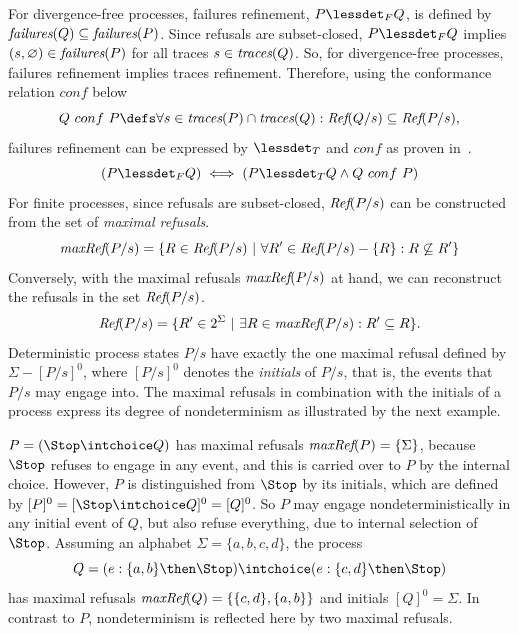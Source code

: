 For divergence-free processes, failures refinement, $P \lessdet_F Q$, is
defined by $\text{\it failures}(Q)\subseteq\text{\it failures}(P)$. Since refusals are subset-closed,
$P \lessdet_F Q$ implies $(s,\varnothing)\in\text{\it failures}(P)$ for all traces
$s\in\text{\it traces}(Q)$. So, for divergence-free processes, failures refinement implies
traces refinement. Therefore, using the conformance relation $conf$ below
%
\begin{equation}\label{eq:conf}
  Q\ conf\ P \defs \forall s\in \trc(P) \cap \trc(Q): \refs(Q/s)
  \subseteq \refs(P/s),
\end{equation}
%
failures refinement can be expressed by $\lessdet_T$ and $conf$ as proven
in~\cite{DBLP:conf/icfem/CavalcantiG07}.
%
\begin{equation}%
\label{eq:failconf}
(P \lessdet_F Q) \iff (P \lessdet_T Q \land Q\ conf\ P)
\end{equation}
%
For finite processes, since refusals are subset-closed, $\text{\it Ref}(P/s)$ can be
constructed from the set of \emph{maximal refusals}.
%
\begin{equation}
\text{\it maxRef}(P/s) = \{ R \in\text{\it Ref}(P/s)~|~\forall R'\in \text{\it Ref}(P/s) - \{ R\}: R \not\subseteq R'\}
\end{equation}
%
Conversely, with the maximal refusals $\text{\it maxRef}(P/s)$ at hand, we can
reconstruct the refusals in the set $\text{\it Ref}(P/s)$. %
%
\begin{equation}\label{eq:refMaxRef}
\text{\it Ref}(P/s) = \{ R'\in 2^\Sigma~|~\exists R\in \text{\it maxRef}(P/s): R'\subseteq R \}.
\end{equation}
%
Deterministic process states $P/s$ have exactly the one maximal refusal
defined by $\Sigma-[P/s]^0$, where $[P/s]^0$ denotes the \emph{initials} of
$P/s$, that is, the events that $P/s$ may engage into. The maximal refusals
in combination with the initials of a process express its degree of
nondeterminism as illustrated by the next example.
%
\begin{example}
\label{ex:nondetdegree} $P = (\Stop \intchoice Q)$ has maximal refusals
$\text{\it maxRef}(P) = \{ \Sigma \}$, because $\Stop$ refuses to engage in any event,
and this is carried over to $P$ by the internal choice. However, $P$ is
distinguished from $\Stop$ by its initials, which are defined by $[P]^0 = [
\Stop \intchoice Q]^0 = [Q]^0$. So $P$ may engage nondeterministically in any
initial event of $Q$, but also refuse everything, due to internal selection
of $\Stop$. Assuming an alphabet $\Sigma = \{a,b,c,d\}$, the process
%
$$Q = (e:\{a,b\} \then \Stop) \intchoice (e:\{c,d\} \then \Stop)$$
%
has maximal refusals $\text{\it maxRef}(Q) = \{ \{c,d\}, \{a,b\} \}$ and initials
$[Q]^0=\Sigma$. In contrast to $P$, nondeterminism is reflected here by
two maximal refusals. \xbox
\end{example}

